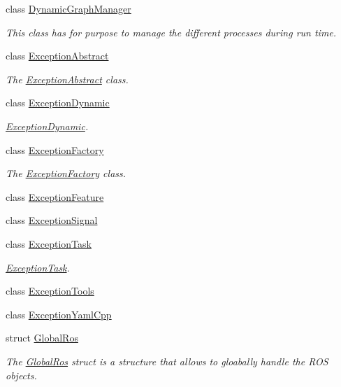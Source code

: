 \begin{DoxyCompactItemize}
class \hyperlink{classdynamic__graph_1_1DynamicGraphManager}{Dynamic\+Graph\+Manager}
\begin{DoxyCompactList}\small\item\em This class has for purpose to manage the different processes during run time. \end{DoxyCompactList}\item 
class \hyperlink{classdynamic__graph_1_1ExceptionAbstract}{Exception\+Abstract}
\begin{DoxyCompactList}\small\item\em The \hyperlink{classdynamic__graph_1_1ExceptionAbstract}{Exception\+Abstract} class. \end{DoxyCompactList}\item 
class \hyperlink{classdynamic__graph_1_1ExceptionDynamic}{Exception\+Dynamic}
\begin{DoxyCompactList}\small\item\em \hyperlink{classdynamic__graph_1_1ExceptionDynamic}{Exception\+Dynamic}. \end{DoxyCompactList}\item 
class \hyperlink{classdynamic__graph_1_1ExceptionFactory}{Exception\+Factory}
\begin{DoxyCompactList}\small\item\em The \hyperlink{classdynamic__graph_1_1ExceptionFactory}{Exception\+Factory} class. \end{DoxyCompactList}\item 
class \hyperlink{classdynamic__graph_1_1ExceptionFeature}{Exception\+Feature}
\item 
class \hyperlink{classdynamic__graph_1_1ExceptionSignal}{Exception\+Signal}
\item 
class \hyperlink{classdynamic__graph_1_1ExceptionTask}{Exception\+Task}
\begin{DoxyCompactList}\small\item\em \hyperlink{classdynamic__graph_1_1ExceptionTask}{Exception\+Task}. \end{DoxyCompactList}\item 
class \hyperlink{classdynamic__graph_1_1ExceptionTools}{Exception\+Tools}
\item 
class \hyperlink{classdynamic__graph_1_1ExceptionYamlCpp}{Exception\+Yaml\+Cpp}
\item 
struct \hyperlink{structdynamic__graph_1_1GlobalRos}{Global\+Ros}
\begin{DoxyCompactList}\small\item\em The \hyperlink{structdynamic__graph_1_1GlobalRos}{Global\+Ros} struct is a structure that allows to gloabally handle the R\+OS objects. \end{DoxyCompactList}\item 

\end{DoxyCompactItemize}
